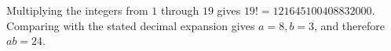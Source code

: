 Multiplying the integers from $1$ through $19$ gives $19!=121645100408832000$. Comparing with the stated decimal expansion gives $a=8,b=3$, and therefore $\boxed{ab=24}$.
